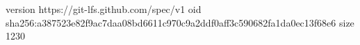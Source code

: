 version https://git-lfs.github.com/spec/v1
oid sha256:a387523e82f9ac7daa08bd6611c970c9a2ddf0aff3c590682fa1da0ec13f68e6
size 1230
